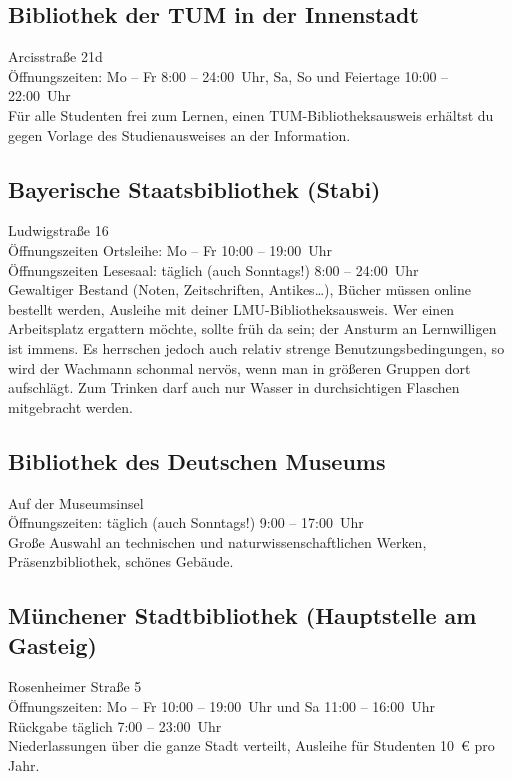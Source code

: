 \subsection*{Bibliothek der TUM in der Innenstadt}
Arcisstraße 21d\\
Öffnungszeiten: Mo -- Fr 8:00 -- 24:00~Uhr, Sa, So und Feiertage 10:00 -- 22:00~Uhr\\
Für alle Studenten frei zum Lernen, einen TUM-Bibliotheksausweis erhältst du gegen Vorlage des Studienausweises an der Information.

\begin{urlList}
\end{urlList}

\subsection*{Bayerische Staatsbibliothek (Stabi)}
Ludwigstraße 16\\
Öffnungszeiten Ortsleihe: Mo -- Fr 10:00 -- 19:00~Uhr\\
Öffnungszeiten Lesesaal: täglich (auch Sonntags!) 8:00 -- 24:00~Uhr\\
Gewaltiger Bestand (Noten, Zeitschriften, Antikes\ldots), Bücher
müssen online bestellt werden, Ausleihe mit deiner LMU-Bibliotheksausweis. Wer
einen Arbeitsplatz ergattern möchte, sollte früh da sein; der
Ansturm an Lernwilligen ist immens.
Es herrschen jedoch auch relativ strenge Benutzungsbedingungen, so wird der Wachmann schonmal nervös, wenn man in größeren Gruppen dort aufschlägt.
Zum Trinken darf auch nur Wasser in durchsichtigen Flaschen mitgebracht werden.

\begin{urlList}
\end{urlList}

\subsection*{Bibliothek des Deutschen Museums}
Auf der Museumsinsel\\
Öffnungszeiten: täglich (auch Sonntags!) 9:00 -- 17:00~Uhr\\
Große Auswahl an technischen und naturwissenschaftlichen Werken, Präsenzbibliothek, schönes Gebäude.

\begin{urlList}
\end{urlList}

\subsection*{Münchener Stadtbibliothek (Hauptstelle am Gasteig)}
Rosenheimer Straße 5\\
Öffnungszeiten: Mo -- Fr 10:00 -- 19:00~Uhr und Sa 11:00 -- 16:00~Uhr\\
Rückgabe täglich 7:00 -- 23:00~Uhr\\
Niederlassungen über die ganze Stadt verteilt, Ausleihe für Studenten 10~€ pro Jahr.

\begin{urlList}
\end{urlList}
